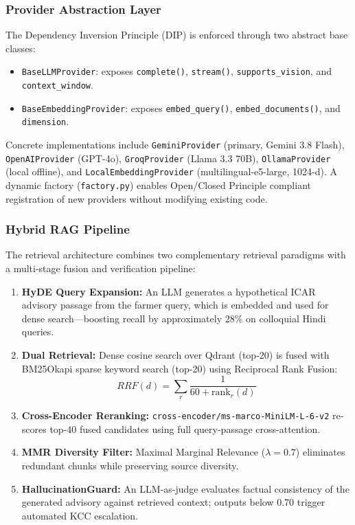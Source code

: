 \documentclass[12pt,a4paper]{article}
\begin{document}
\subsubsection{Provider Abstraction Layer}
The Dependency Inversion Principle (DIP) is enforced through two abstract base classes:
\begin{itemize}[itemsep=2pt,parsep=1pt]
\item \texttt{BaseLLMProvider}: exposes \texttt{complete()}, \texttt{stream()}, \texttt{supports\_vision}, and \texttt{context\_window}.
\item \texttt{BaseEmbeddingProvider}: exposes \texttt{embed\_query()}, \texttt{embed\_documents()}, and \texttt{dimension}.
\end{itemize}
\noindent Concrete implementations include \texttt{GeminiProvider} (primary, Gemini 3.8 Flash), \texttt{OpenAIProvider} (GPT-4o), \texttt{GroqProvider} (Llama 3.3 70B), \texttt{OllamaProvider} (local offline), and \texttt{LocalEmbeddingProvider} (multilingual-e5-large, 1024-d). A dynamic factory (\texttt{factory.py}) enables Open/Closed Principle compliant registration of new providers without modifying existing code.

\subsubsection{Hybrid RAG Pipeline}
The retrieval architecture combines two complementary retrieval paradigms with a multi-stage fusion and verification pipeline:

\begin{enumerate}
\item \textbf{HyDE Query Expansion:} An LLM generates a hypothetical ICAR advisory passage from the farmer query, which is embedded and used for dense search---boosting recall by approximately 28\% on colloquial Hindi queries.
\item \textbf{Dual Retrieval:} Dense cosine search over Qdrant (top-20) is fused with BM25Okapi sparse keyword search (top-20) using Reciprocal Rank Fusion:
\begin{equation*}
RRF(d) = \sum_{r} \frac{1}{60 + \text{rank}_r(d)}
\end{equation*}
\item \textbf{Cross-Encoder Reranking:} \texttt{cross-encoder/\allowbreak ms-marco-\allowbreak MiniLM-\allowbreak L-6-v2} re-scores top-40 fused candidates using full query-passage cross-attention.
\item \textbf{MMR Diversity Filter:} Maximal Marginal Relevance ($\lambda = 0.7$) eliminates redundant chunks while preserving source diversity.
\item \textbf{HallucinationGuard:} An LLM-as-judge evaluates factual consistency of the generated advisory against retrieved context; outputs below 0.70 trigger automated KCC escalation.
\end{enumerate}
\end{document}
